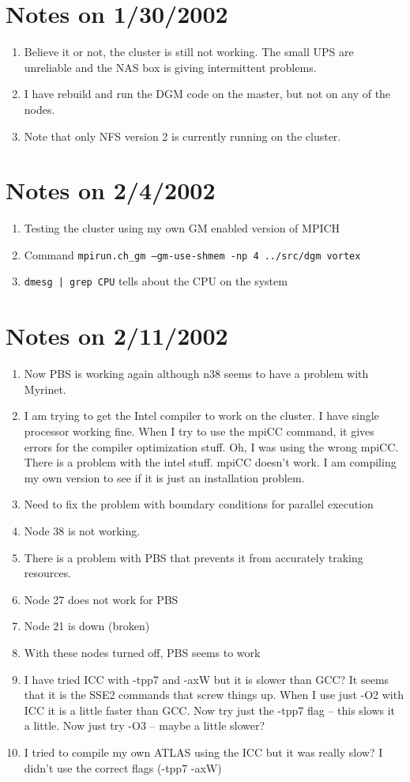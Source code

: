 \documentclass[10pt]{article}
\begin{document}
\section*{\normalsize Notes on 1/30/2002}
\begin{enumerate}
\item Believe it or not, the cluster is still not working.  The small UPS are
unreliable and the NAS box is giving intermittent problems.
\item I have rebuild and run the DGM code on the master, but not on any of the
nodes.
\item Note that only NFS version 2 is currently running on the cluster.
\end{enumerate}

\section*{\normalsize Notes on 2/4/2002}
\begin{enumerate}
\item Testing the cluster using my own GM enabled version of MPICH
\item Command {\tt mpirun.ch\_gm --gm-use-shmem -np 4 ../src/dgm vortex}
\item {\tt dmesg | grep CPU} tells about the CPU on the system
\end{enumerate}

\section*{\normalsize Notes on 2/11/2002}
\begin{enumerate}
\item Now PBS is working again although n38 seems to have a problem with
Myrinet.
\item I am trying to get the Intel compiler to work on the cluster.  I have
single processor working fine. When I try to use the mpiCC command, it gives
errors for the compiler optimization stuff.  Oh, I was using the wrong mpiCC.
There is a problem with the intel stuff.  mpiCC doesn't work.  I am compiling
my own version to see if it is just an installation problem.
\item Need to fix the problem with boundary conditions for parallel execution
\item Node 38 is not working.
\item There is a problem with PBS that prevents it from accurately traking
resources.
\item Node 27 does not work for PBS
\item Node 21 is down (broken)
\item With these nodes turned off, PBS seems to work
\item I have tried ICC with -tpp7 and -axW but it is slower than GCC?  It
seems that it is the SSE2 commands that screw things up.  When I use just -O2
with ICC it is a little faster than GCC.  Now try just the -tpp7 flag -- this
slows it a little.  Now just try -O3 -- maybe a little slower?
\item I tried to compile my own ATLAS using the ICC but it was really slow?  I
didn't use the correct flags (-tpp7 -axW)
\end{enumerate}
\end{document}
